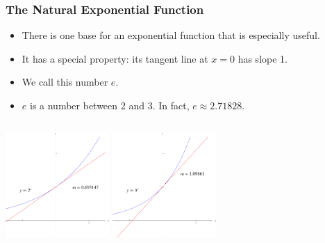 \begin{frame}
\frametitle{The Natural Exponential Function}
\begin{itemize}
\item  There is one base for an exponential function that is especially useful.
\item<2->  It has a special property: its tangent line at $x = 0$ has slope 1.
\item<3->  We call this number $e$.
\item<4->  $e$ is a number between 2 and 3.  In fact, $e\approx 2.71828$.  
\end{itemize}

\begin{columns}
\includegraphics[height=4cm]{exponential-functions/pictures/exp-tangent-two.pdf}%
%
\includegraphics[height=4cm]{exponential-functions/pictures/exp-tangent-three.pdf}%
\end{columns}
\end{frame}
